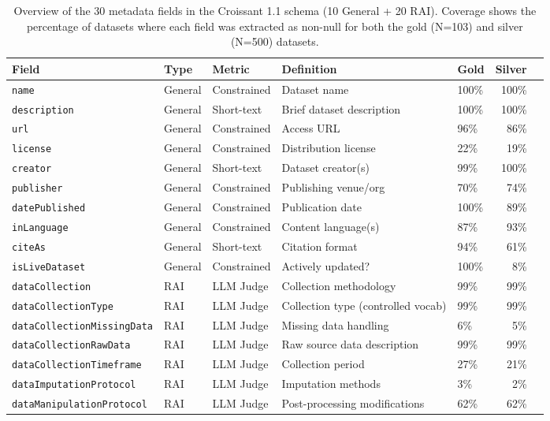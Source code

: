 \begin{table}[t]
\centering
\caption{Overview of the 30 metadata fields in the Croissant 1.1 schema (10 General + 20 RAI). Coverage shows the percentage of datasets where each field was extracted as non-null for both the gold (N=103) and silver (N=500) datasets.}
\label{tab:field-overview}
\small
\begin{tabular}{lllllrr}
\toprule
Field & Type & Metric & Definition & Gold & Silver \\
\midrule
\texttt{name} & General & Constrained & Dataset name & 100\% & 100\% \\
\texttt{description} & General & Short-text & Brief dataset description & 100\% & 100\% \\
\texttt{url} & General & Constrained & Access URL & 96\% & 86\% \\
\texttt{license} & General & Constrained & Distribution license & 22\% & 19\% \\
\texttt{creator} & General & Short-text & Dataset creator(s) & 99\% & 100\% \\
\texttt{publisher} & General & Constrained & Publishing venue/org & 70\% & 74\% \\
\texttt{datePublished} & General & Constrained & Publication date & 100\% & 89\% \\
\texttt{inLanguage} & General & Constrained & Content language(s) & 87\% & 93\% \\
\texttt{citeAs} & General & Short-text & Citation format & 94\% & 61\% \\
\texttt{isLiveDataset} & General & Constrained & Actively updated? & 100\% & 8\% \\
\midrule
\texttt{dataCollection} & RAI & LLM Judge & Collection methodology & 99\% & 99\% \\
\texttt{dataCollectionType} & RAI & LLM Judge & Collection type (controlled vocab) & 99\% & 99\% \\
\texttt{dataCollectionMissingData} & RAI & LLM Judge & Missing data handling & 6\% & 5\% \\
\texttt{dataCollectionRawData} & RAI & LLM Judge & Raw source data description & 99\% & 99\% \\
\texttt{dataCollectionTimeframe} & RAI & LLM Judge & Collection period & 27\% & 21\% \\
\texttt{dataImputationProtocol} & RAI & LLM Judge & Imputation methods & 3\% & 2\% \\
\texttt{dataManipulationProtocol} & RAI & LLM Judge & Post-processing modifications & 62\% & 62\% \\

\end{tabular}
\end{table}
